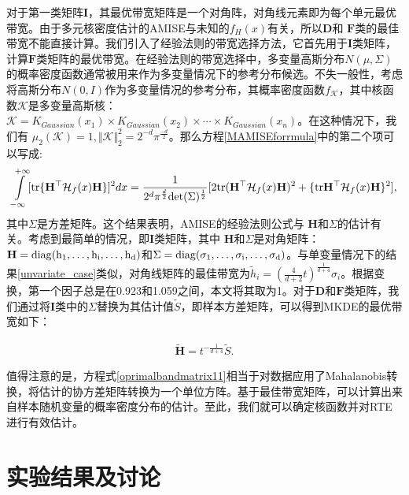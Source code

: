对于第一类矩阵$\mathbf{I}$，其最优带宽矩阵是一个对角阵，对角线元素即为每个单元最优带宽。由于多元核密度估计的AMISE与未知的$f_{H}(x)$有关，所以$\mathbf{D}$和 $\mathbf{F}$类的最佳带宽不能直接计算。我们引入了经验法则的带宽选择方法，它首先用于$\mathbf{I}$类矩阵，计算$\mathbf{F}$类矩阵的最优带宽。在经验法则的带宽选择中，多变量高斯分布$N(\mu, \Sigma)$的概率密度函数通常被用来作为多变量情况下的参考分布候选。不失一般性，考虑将高斯分布$N(0, I)$作为多变量情况的参考分布，其概率密度函数$f_{\mathcal{K}}$，其中核函数$\mathcal{K}$是多变量高斯核：  $\mathcal{K} = K_{Gaussian}(x_{1})\times K_{Gaussian}(x_{2})\times \cdots \times K_{Gaussian}(x_{n})$。在这种情况下，我们有 $\mu_{2}(\mathcal{K}) = 1, \Vert{\mathcal{K}\Vert^{2}_{2}}=2^{-d}\pi^{\frac{-d}{2}}$。那么方程\eqref{MAMISEforrmula}中的第二个项可以写成:
\begin{align*}
\int\limits_{-\infty}^{+\infty}[\hbox{tr}\{\mathbf{H}^{\top}\mathcal{H}_{f}(x)\mathbf{H}\}]^{2}dx
=\frac{1}{2^{d}\pi^{\frac{d}{2}}\rm{det}(\Sigma)^{\frac{1}{2}}}[2\hbox{tr}(\mathbf{H}^{\top}
\mathcal{H}_{f}(x)\mathbf{H})^{2}+\{\hbox{tr}\mathbf{H}^{\top}\mathcal{H}_{f}(x)\mathbf{H}\}^{2}],
\end{align*}
其中$\Sigma$是方差矩阵。这个结果表明，AMISE的经验法则公式与 $\mathbf{H}$和$\Sigma$的估计有关。考虑到最简单的情况，即$\mathbf{I}$类矩阵，其中 $\mathbf{H}$和$\Sigma$是对角矩阵：$\mathbf{H}=\rm{diag} (h_{1},\ldots,h_{i},\ldots,h_{d})$和$\Sigma=\rm{diag}(\sigma_{1}, \ldots, \sigma_{i}, \ldots, \sigma_{d})$。与单变量情况下的结果\eqref{unvariate_case}类似，对角线矩阵的最佳带宽为$\tilde{h}_{i}=(\frac{4}{d+2}t)^{\frac{1}{d+4}}\sigma_{i}$。根据\cite{3_24}变换，第一个因子总是在0.923和1.059之间，本文将其取为1。对于$\mathbf{D}$和$\mathbf{F}$类矩阵，我们通过将$\mathbf{I}$类中的$\Sigma$替换为其估计值$\tilde{S}$，即样本方差矩阵，可以得到MKDE的最优带宽如下：

\begin{align}\label{oprimalbandmatrix11}
\tilde{\mathbf{H}}= t^{-\frac{1}{d+4}}\tilde{S}.
\end{align}

值得注意的是，方程式\eqref{oprimalbandmatrix11}相当于对数据应用了Mahalanobis转换，将估计的协方差矩阵转换为一个单位方阵。基于最佳带宽矩阵，可以计算出来自样本随机变量的概率密度分布的估计。至此，我们就可以确定核函数并对RTE进行有效估计。



\section{实验结果及讨论}\label{c}

